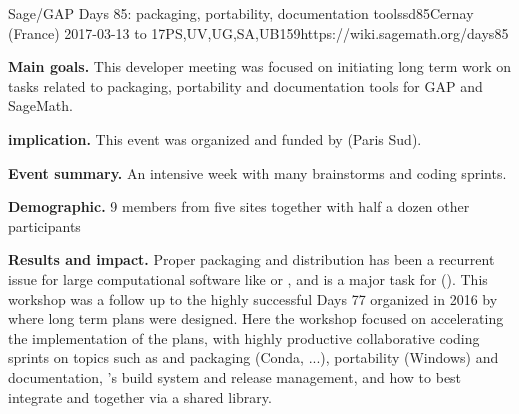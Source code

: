\begin{event}{Sage/GAP Days 85: packaging, portability, documentation tools}{sd85}{Cernay (France) 2017-03-13 to 17}{PS,UV,UG,SA,UB}{15}{9}{https://wiki.sagemath.org/days85}

  \textbf{Main goals.} This developer meeting was focused on
  initiating long term work on \ODK tasks related to packaging,
  portability and documentation tools for GAP and SageMath.

  \textbf{\ODK implication.} This event was organized and funded by
  \ODK (Paris Sud).

  \textbf{Event summary.} An intensive week with many brainstorms and coding sprints.

  \textbf{Demographic.} 9 \ODK members from five sites together with
  half a dozen other participants

  \textbf{Results and impact.} Proper packaging and distribution has
  been a recurrent issue for large computational software like \Sage
  or \GAP, and is a major task for \ODK
  (). This workshop
  was a follow up to the highly successful \Sage Days 77 organized in
  2016 by \ODK where long term plans were designed. Here the workshop
  focused on accelerating the implementation of the plans, with highly
  productive collaborative coding sprints on topics such as \GAP and
  \Sage packaging (Conda, ...), \Sage portability (Windows) and
  documentation, \GAP's build system and release management, and how
  to best integrate \GAP and \Sage together via a shared library.
\end{event}

